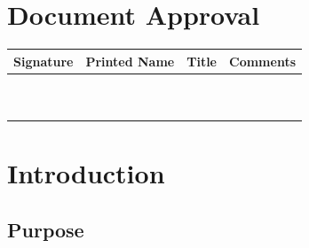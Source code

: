 \documentclass[11pt]{article}
\begin{document}
\section{Document Approval}
\begin{table}[h]
\begin{tabular}{llll}
\textbf{Signature}     & \textbf{Printed Name} & \textbf{Title}        & \textbf{Comments}     \\ \hline
\multicolumn{1}{|l|}{} & \multicolumn{1}{L{4.5cm}|}{} & \multicolumn{1}{L{4cm}|}{} & \multicolumn{1}{L{4cm}|}{} \\ \hline
\multicolumn{1}{|l|}{} & \multicolumn{1}{l|}{} & \multicolumn{1}{l|}{} & \multicolumn{1}{l|}{} \\ \hline
\multicolumn{1}{|l|}{} & \multicolumn{1}{l|}{} & \multicolumn{1}{l|}{} & \multicolumn{1}{l|}{} \\ \hline
\multicolumn{1}{|l|}{} & \multicolumn{1}{l|}{} & \multicolumn{1}{l|}{} & \multicolumn{1}{l|}{} \\ \hline
\multicolumn{1}{|l|}{} & \multicolumn{1}{l|}{} & \multicolumn{1}{l|}{} & \multicolumn{1}{l|}{} \\ \hline
\multicolumn{1}{|l|}{} & \multicolumn{1}{l|}{} & \multicolumn{1}{l|}{} & \multicolumn{1}{l|}{} \\ \hline
\multicolumn{1}{|l|}{} & \multicolumn{1}{l|}{} & \multicolumn{1}{l|}{} & \multicolumn{1}{l|}{} \\ \hline
\multicolumn{1}{|l|}{} & \multicolumn{1}{l|}{} & \multicolumn{1}{l|}{} & \multicolumn{1}{l|}{} \\ \hline
\multicolumn{1}{|l|}{} & \multicolumn{1}{l|}{} & \multicolumn{1}{l|}{} & \multicolumn{1}{l|}{} \\ \hline
\multicolumn{1}{|l|}{} & \multicolumn{1}{l|}{} & \multicolumn{1}{l|}{} & \multicolumn{1}{l|}{} \\ \hline
\end{tabular}
\end{table}

\newpage
\section{Introduction}

\subsection{Purpose}
\end{document}
